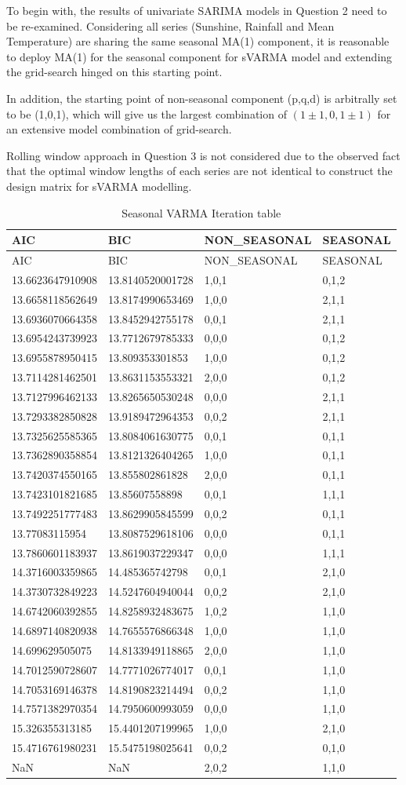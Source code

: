 \documentclass[
  11pt,
]{article}
\begin{document}
To begin with, the results of univariate SARIMA models in Question 2
need to be re-examined. Considering all series (Sunshine, Rainfall and
Mean Temperature) are sharing the same seasonal MA(1) component, it is
reasonable to deploy MA(1) for the seasonal component for sVARMA model
and extending the grid-search hinged on this starting point.

In addition, the starting point of non-seasonal component (p,q,d) is
arbitrally set to be (1,0,1), which will give us the largest combination
of \((1\pm1, 0, 1\pm1)\) for an extensive model combination of
grid-search.

Rolling window approach in Question 3 is not considered due to the
observed fact that the optimal window lengths of each series are not
identical to construct the design matrix for sVARMA modelling.

\begin{longtable}[]{@{}llll@{}}
\caption{Seasonal VARMA Iteration table}\tabularnewline
\toprule
AIC & BIC & NON\_SEASONAL & SEASONAL\tabularnewline
\midrule
\endfirsthead
\toprule
AIC & BIC & NON\_SEASONAL & SEASONAL\tabularnewline
\midrule
\endhead
13.6623647910908 & 13.8140520001728 & 1,0,1 & 0,1,2\tabularnewline
13.6658118562649 & 13.8174990653469 & 1,0,0 & 2,1,1\tabularnewline
13.6936070664358 & 13.8452942755178 & 0,0,1 & 2,1,1\tabularnewline
13.6954243739923 & 13.7712679785333 & 0,0,0 & 0,1,2\tabularnewline
13.6955878950415 & 13.809353301853 & 1,0,0 & 0,1,2\tabularnewline
13.7114281462501 & 13.8631153553321 & 2,0,0 & 0,1,2\tabularnewline
13.7127996462133 & 13.8265650530248 & 0,0,0 & 2,1,1\tabularnewline
13.7293382850828 & 13.9189472964353 & 0,0,2 & 2,1,1\tabularnewline
13.7325625585365 & 13.8084061630775 & 0,0,1 & 0,1,1\tabularnewline
13.7362890358854 & 13.8121326404265 & 1,0,0 & 0,1,1\tabularnewline
13.7420374550165 & 13.855802861828 & 2,0,0 & 0,1,1\tabularnewline
13.7423101821685 & 13.85607558898 & 0,0,1 & 1,1,1\tabularnewline
13.7492251777483 & 13.8629905845599 & 0,0,2 & 0,1,1\tabularnewline
13.77083115954 & 13.8087529618106 & 0,0,0 & 0,1,1\tabularnewline
13.7860601183937 & 13.8619037229347 & 0,0,0 & 1,1,1\tabularnewline
14.3716003359865 & 14.485365742798 & 0,0,1 & 2,1,0\tabularnewline
14.3730732849223 & 14.5247604940044 & 0,0,2 & 2,1,0\tabularnewline
14.6742060392855 & 14.8258932483675 & 1,0,2 & 1,1,0\tabularnewline
14.6897140820938 & 14.7655576866348 & 1,0,0 & 1,1,0\tabularnewline
14.699629505075 & 14.8133949118865 & 2,0,0 & 1,1,0\tabularnewline
14.7012590728607 & 14.7771026774017 & 0,0,1 & 1,1,0\tabularnewline
14.7053169146378 & 14.8190823214494 & 0,0,2 & 1,1,0\tabularnewline
14.7571382970354 & 14.7950600993059 & 0,0,0 & 1,1,0\tabularnewline
15.326355313185 & 15.4401207199965 & 1,0,0 & 2,1,0\tabularnewline
15.4716761980231 & 15.5475198025641 & 0,0,2 & 0,1,0\tabularnewline
NaN & NaN & 2,0,2 & 1,1,0\tabularnewline
\bottomrule
\end{longtable}
\end{document}
